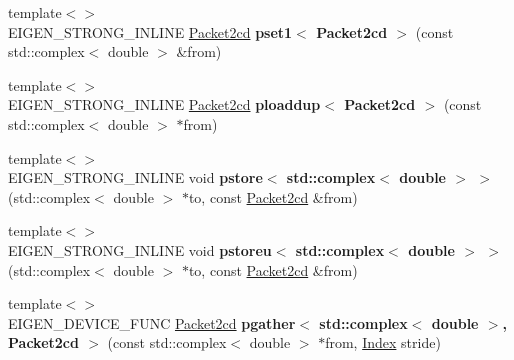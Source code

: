 \begin{DoxyCompactItemize}
\item 
\mbox{\label{namespace_eigen_1_1internal_a288388acc2f71e36177000f0af0b95f3}} 
{\footnotesize template$<$$>$ }\\E\+I\+G\+E\+N\+\_\+\+S\+T\+R\+O\+N\+G\+\_\+\+I\+N\+L\+I\+NE \hyperlink{struct_eigen_1_1internal_1_1_packet2cd}{Packet2cd} {\bfseries pset1$<$ Packet2cd $>$} (const std\+::complex$<$ double $>$ \&from)
\item 
\mbox{\label{namespace_eigen_1_1internal_a2e52c9622c158218f05a6733c4706126}} 
{\footnotesize template$<$$>$ }\\E\+I\+G\+E\+N\+\_\+\+S\+T\+R\+O\+N\+G\+\_\+\+I\+N\+L\+I\+NE \hyperlink{struct_eigen_1_1internal_1_1_packet2cd}{Packet2cd} {\bfseries ploaddup$<$ Packet2cd $>$} (const std\+::complex$<$ double $>$ $\ast$from)
\item 
\mbox{\label{namespace_eigen_1_1internal_a99b1419302b13f40adcca27bacf24631}} 
{\footnotesize template$<$$>$ }\\E\+I\+G\+E\+N\+\_\+\+S\+T\+R\+O\+N\+G\+\_\+\+I\+N\+L\+I\+NE void {\bfseries pstore$<$ std\+::complex$<$ double $>$ $>$} (std\+::complex$<$ double $>$ $\ast$to, const \hyperlink{struct_eigen_1_1internal_1_1_packet2cd}{Packet2cd} \&from)
\item 
\mbox{\label{namespace_eigen_1_1internal_afc27251451fdb81ca48106b7bdc72b25}} 
{\footnotesize template$<$$>$ }\\E\+I\+G\+E\+N\+\_\+\+S\+T\+R\+O\+N\+G\+\_\+\+I\+N\+L\+I\+NE void {\bfseries pstoreu$<$ std\+::complex$<$ double $>$ $>$} (std\+::complex$<$ double $>$ $\ast$to, const \hyperlink{struct_eigen_1_1internal_1_1_packet2cd}{Packet2cd} \&from)
\item 
\mbox{\label{namespace_eigen_1_1internal_afbd89fb076eab46f484f7cd9c6fee5af}} 
{\footnotesize template$<$$>$ }\\E\+I\+G\+E\+N\+\_\+\+D\+E\+V\+I\+C\+E\+\_\+\+F\+U\+NC \hyperlink{struct_eigen_1_1internal_1_1_packet2cd}{Packet2cd} {\bfseries pgather$<$ std\+::complex$<$ double $>$, Packet2cd $>$} (const std\+::complex$<$ double $>$ $\ast$from, \hyperlink{namespace_eigen_a62e77e0933482dafde8fe197d9a2cfde}{Index} stride)
\item 

\end{DoxyCompactItemize}

